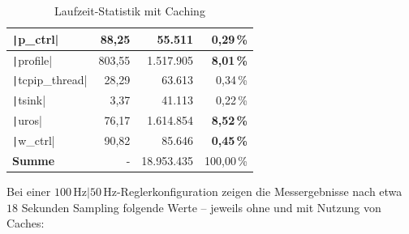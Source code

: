 \begin{table}[H]
{{\begin{minipage}[b]{0.50\hsize}
\begin{tabular}{|l|r|r|r|}
        \texttt|p_ctrl| & 88,25 & 55.511 & \textbf{0,29\,\%} \\ \hline
        \texttt|profile| & 803,55 & 1.517.905 & \textbf{8,01\,\%} \\ \hline
        \texttt|tcpip_thread| & 28,29 & 63.613 & 0,34\,\% \\ \hline
        \texttt|tsink| & 3,37 & 41.113 & 0,22\,\% \\ \hline
        \texttt|uros| & 76,17 & 1.614.854 & \textbf{8,52\,\%} \\ \hline
        \texttt|w_ctrl| & 90,82 & 85.646 & \textbf{0,45\,\%} \\ \hline
        \hline
        \textbf{Summe} & - & 18.953.435 & 100,00\,\% \\ \hline
        \end{tabular}
        \caption{Laufzeit-Statistik mit Caching}
    \end{minipage}
}}
\end{table}

Bei einer $100\,\text{Hz}\text{|}50\,\text{Hz}$-Reglerkonfiguration zeigen die
Messergebnisse nach etwa $18$ Sekunden Sampling folgende Werte -- jeweils ohne
und mit Nutzung von Caches:

